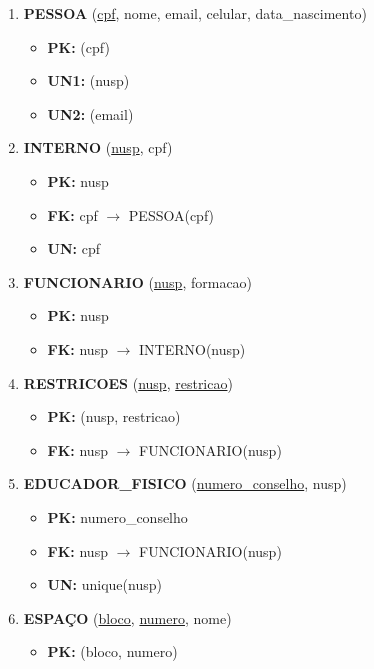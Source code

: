 \documentclass{article}
\begin{document}
\begin{enumerate}
    \item \textbf{PESSOA} (\underline{cpf}, nome, email, celular, data\_nascimento)
        \begin{itemize}
            \item \textbf{PK:} (cpf)
            \item \textbf{UN1:} (nusp)
            \item \textbf{UN2:} (email)
        \end{itemize}

    \item \textbf{INTERNO} (\underline{nusp}, cpf)
        \begin{itemize}
            \item \textbf{PK:} nusp
            \item \textbf{FK:} cpf $\rightarrow$ PESSOA(cpf)
            \item \textbf{UN:} cpf
        \end{itemize}

    \item \textbf{FUNCIONARIO} (\underline{nusp}, formacao)
        \begin{itemize}
            \item \textbf{PK:} nusp
            \item \textbf{FK:} nusp $\rightarrow$ INTERNO(nusp)
        \end{itemize}
        
    \item \textbf{RESTRICOES} (\underline{nusp}, \underline{restricao})
        \begin{itemize}
            \item \textbf{PK:} (nusp, restricao)
            \item \textbf{FK:} nusp $\rightarrow$ FUNCIONARIO(nusp)
        \end{itemize}

    \item \textbf{EDUCADOR\_FISICO} (\underline{numero\_conselho}, nusp)
        \begin{itemize}
            \item \textbf{PK:} numero\_conselho
            \item \textbf{FK:} nusp $\rightarrow$ FUNCIONARIO(nusp)
            \item \textbf{UN:} unique(nusp)
        \end{itemize}

    \item \textbf{ESPAÇO} (\underline{bloco}, \underline{numero}, nome)
        \begin{itemize}
            \item \textbf{PK:} (bloco, numero)
        \end{itemize}


\end{enumerate}
\end{document}
